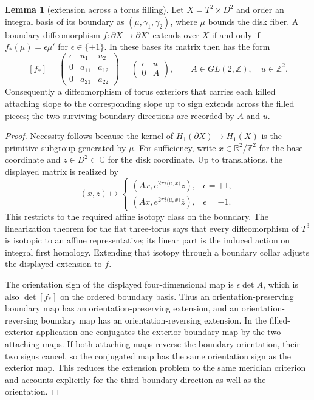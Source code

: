 \documentclass[11pt]{article}
\theoremstyle{definition}
\newtheorem{lemma}[theorem]{Lemma}
\begin{document}
\begin{lemma}[extension across a torus filling]\label{lem:torus-extension}
Let $X=T^2\times D^2$ and order an integral basis of its boundary as
$(\mu,\gamma_1,\gamma_2)$, where $\mu$ bounds the disk fiber.  A boundary
diffeomorphism $f:\partial X\to\partial X'$ extends over $X$ if and only if
$f_*(\mu)=\epsilon\mu'$ for $\epsilon\in\{\pm1\}$.  In these bases its
matrix then has the form
\[
 [f_*]=
 \begin{pmatrix}
  \epsilon & u_1 & u_2\\
  0 & a_{11} & a_{12}\\
  0 & a_{21} & a_{22}
 \end{pmatrix}
 =\begin{pmatrix}\epsilon&u\\0&A\end{pmatrix},
 \qquad A\in GL(2,\mathbb Z),\quad u\in\mathbb Z^2.
\]
Consequently a diffeomorphism of torus exteriors that carries each killed
attaching slope to the corresponding slope up to sign extends across the
filled pieces; the two surviving boundary directions are recorded by
$A$ and $u$.
\end{lemma}

\begin{proof}
Necessity follows because the kernel of
$H_1(\partial X)\to H_1(X)$ is the primitive subgroup generated by $\mu$.
For sufficiency, write $x\in\mathbb R^2/\mathbb Z^2$ for the base coordinate
and $z\in D^2\subset\mathbb C$ for the disk coordinate.  Up to translations,
the displayed matrix is realized by
\[
 (x,z)\longmapsto
 \begin{cases}
  (Ax,e^{2\pi i\langle u,x\rangle}z),&\epsilon=+1,\\
  (Ax,e^{2\pi i\langle u,x\rangle}\overline z),&\epsilon=-1.
 \end{cases}
\]
This restricts to the required affine isotopy class on the boundary.  The
linearization theorem for the flat three-torus
\cite[case~(IV), pp.~464--465]{HatcherLinearization} says that every
diffeomorphism of $T^3$ is isotopic to an affine representative; its linear
part is the induced action on integral first homology.  Extending that isotopy
through a boundary collar adjusts the displayed extension to $f$.

The orientation sign of the displayed four-dimensional map is
$\epsilon\det A$, which is also $\det[f_*]$ on the ordered boundary basis.
Thus an orientation-preserving boundary map has an orientation-preserving
extension, and an orientation-reversing boundary map has an
orientation-reversing extension.  In the filled-exterior application one
conjugates the exterior boundary map by the two attaching maps.  If both
attaching maps reverse the boundary orientation, their two signs cancel, so
the conjugated map has the same orientation sign as the exterior map.  This
reduces the extension problem to the same meridian criterion and accounts
explicitly for the third boundary direction as well as the orientation.
\end{proof}
\end{document}
